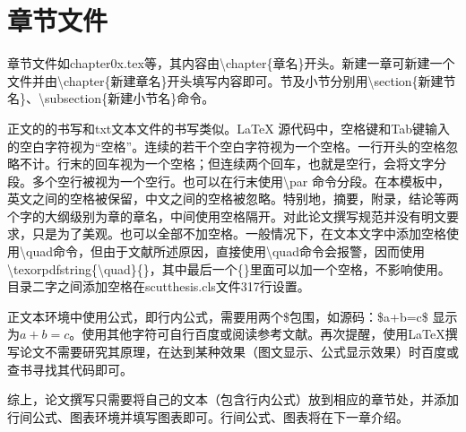 \section{章节文件}
章节文件如chapter0x.tex等，其内容由\textbackslash{}chapter\{章名\}开头。新建一章可新建一个文件并由\textbackslash{}chapter\{新建章名\}开头填写内容即可。节及小节分别用\textbackslash{}section\{新建节名\}、\textbackslash{}subsection\{新建小节名\}命令。

正文的的书写和txt文本文件的书写类似。\LaTeX{} 源代码中，空格键和Tab键输入的空白字符视为“空格”。连续的若干个空白字符视为一个空格。一行开头的空格忽略不计。行末的回车视为一个空格；但连续两个回车，也就是空行，会将文字分段。多个空行被视为一个空行。也可以在行末使用\textbackslash{}par 命令分段。在本模板中，英文之间的空格被保留，中文之间的空格被忽略。特别地，摘要，附录，结论等两个字的大纲级别为章的章名，中间使用空格隔开。对此论文撰写规范并没有明文要求，只是为了美观。也可以全部不加空格。一般情况下，在文本文字中添加空格使用\textbackslash{}quad命令，但由于文献\parencite{_i}所述原因，直接使用\textbackslash{}quad命令会报警，因而使用\textbackslash{}texorpdfstring\{\textbackslash{}quad\}\{\}，其中最后一个\{\}里面可以加一个空格，不影响使用。目录二字之间添加空格在scutthesis.cls文件317行设置。

正文本环境中使用公式，即行内公式，需要用两个\$包围，如源码：\$a+b=c\$ 显示为$a+b=c$。使用其他字符可自行百度或阅读参考文献。再次提醒，使用\LaTeX{}撰写论文不需要研究其原理，在达到某种效果（图文显示、公式显示效果）时百度或查书寻找其代码即可。

综上，论文撰写只需要将自己的文本（包含行内公式）放到相应的章节处，并添加行间公式、图表环境并填写图表即可。行间公式、图表将在下一章介绍。

